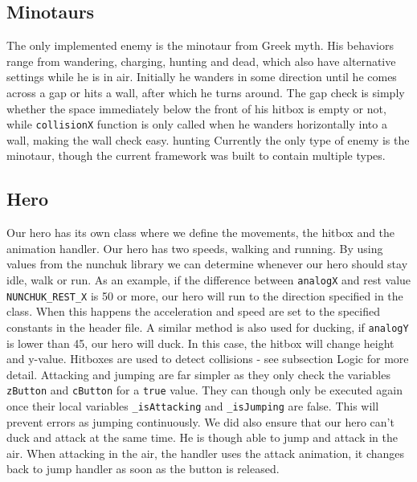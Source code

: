 \subsection*{Minotaurs} %
The only implemented enemy is the minotaur from Greek myth. His behaviors range from wandering, charging, hunting and dead, which also have alternative settings while he is in air. Initially he wanders in some direction until he comes across a gap or hits a wall, after which he turns around. The gap check is simply whether the space immediately below the front of his hitbox is empty or not, while {\tt collisionX} function is only called when he wanders horizontally into a wall, making the wall check easy.
hunting
\newline
Currently the only type of enemy is the minotaur, though the current framework was built to contain multiple types.

\subsection*{Hero}
Our hero has its own class where we define the movements, the hitbox and the animation handler.
\newline
Our hero has two speeds, walking and running. By using values from the nunchuk library we can determine whenever our hero should stay idle, walk or run. As an example, if the difference between {\tt analogX} and rest value {\tt NUNCHUK\_REST\_X} is 50 or more, our hero will run to the direction specified in the class. When this happens the acceleration and speed are set to the specified constants in the header file.  A similar method is also used for ducking, if {\tt analogY} is lower than 45, our hero will duck. In this case, the hitbox will change height and y-value. Hitboxes are used to detect collisions - see subsection Logic for more detail.
\newline
Attacking and jumping are far simpler as they only check the variables {\tt zButton} and {\tt cButton} for a {\tt true} value. They can though only be executed again once their local variables {\tt \_isAttacking} and {\tt \_isJumping} are false. This will prevent errors as jumping continuously. We did also ensure that our hero can't duck and attack at the same time. He is though able to jump and attack in the air. When attacking in the air, the handler uses the attack animation, it changes back to jump handler as soon as the button is released.

